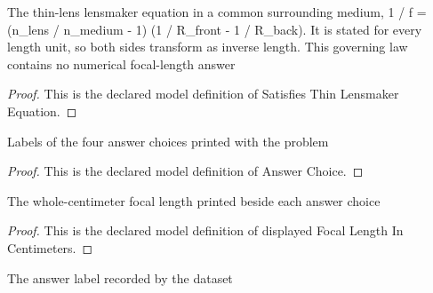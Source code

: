 \begin{definition}
  \label{def:physics:phyx-mini-0067:phyxminiproblems-problemphyxmini0067-satisfiesthinlensmakerequation}
  The thin-lens lensmaker equation in a common surrounding medium, 1 / f = (n\_lens / n\_medium - 1) (1 / R\_front - 1 / R\_back). It is stated for every length unit, so both sides transform as inverse length. This governing law contains no numerical focal-length answer
\end{definition}
\begin{proof}
  This is the declared model definition of Satisfies Thin Lensmaker Equation.
\end{proof}
\begin{definition}
  \label{def:physics:phyx-mini-0067:phyxminiproblems-problemphyxmini0067-answerchoice}
  Labels of the four answer choices printed with the problem
\end{definition}
\begin{proof}
  This is the declared model definition of Answer Choice.
\end{proof}
\begin{definition}
  \label{def:physics:phyx-mini-0067:phyxminiproblems-problemphyxmini0067-displayedfocallengthincentimeters}
  The whole-centimeter focal length printed beside each answer choice
\end{definition}
\begin{proof}
  This is the declared model definition of displayed Focal Length In Centimeters.
\end{proof}
\begin{definition}
  \label{def:physics:phyx-mini-0067:phyxminiproblems-problemphyxmini0067-recordedanswerchoice}
  The answer label recorded by the dataset
\end{definition}
